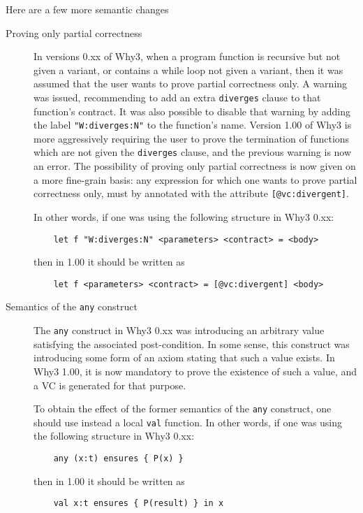 \documentclass[a4paper,11pt,twoside,openright]{memoir}
\begin{document}
Here are a few more semantic changes
\begin{description}
\item[Proving only partial correctness] In versions 0.xx of Why3, when
  a program function is recursive but not given a variant, or contains
  a while loop not given a variant, then it was assumed that the user
  wants to prove partial correctness only. A warning was issued,
  recommending to add an extra \verb|diverges| clause to that
  function's contract. It was also possible to disable that warning by
  adding the label \verb|"W:diverges:N"| to the function's
  name. Version 1.00 of Why3 is more aggressively requiring the user
  to prove the termination of functions which are not given the
  \verb|diverges| clause, and the previous warning is now an
  error. The possibility of proving only partial correctness is now
  given on a more fine-grain basis: any expression for which one wants
  to prove partial correctness only, must by annotated with the
  attribute \verb|[@vc:divergent]|.

  In other words, if one was using the following structure in Why3 0.xx:
  \begin{lstlisting}
    let f "W:diverges:N" <parameters> <contract> = <body>
  \end{lstlisting}
  then in 1.00 it should be written as
  \begin{lstlisting}
    let f <parameters> <contract> = [@vc:divergent] <body>
  \end{lstlisting}
\item[Semantics of the \texttt{any} construct] The \verb|any| construct
  in Why3 0.xx was introducing an arbitrary value satisfying the
  associated post-condition. In some sense, this construct was
  introducing some form of an axiom stating that such a value
  exists. In Why3 1.00, it is now mandatory to prove the existence of
  such a value, and a VC is generated for that purpose.

  To obtain the effect of the former semantics of the \verb|any| construct, one should use instead a local \verb|val| function. In other words, if one was using the following structure in Why3 0.xx:
  \begin{lstlisting}
    any (x:t) ensures { P(x) }
  \end{lstlisting}
  then in 1.00 it should be written as
  \begin{lstlisting}
    val x:t ensures { P(result) } in x
  \end{lstlisting}


\end{description}
\end{document}
